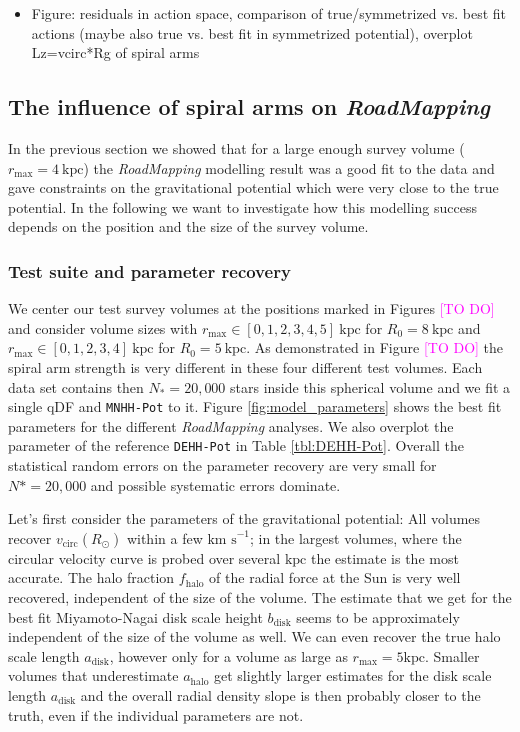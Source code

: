 \documentclass[iop,revtex4,numberedappendix,appendixfloats]{emulateapj}
\newcommand{\RM}{{\sl RoadMapping}}
\newcommand{\Wilma}[1]{\textcolor{Magenta}{#1}}
\begin{document}
\begin{itemize}
\item Figure: residuals in action space, comparison of true/symmetrized vs. best fit actions (maybe also true vs. best fit in symmetrized potential), overplot Lz=vcirc*Rg of spiral arms
\end{itemize}

\clearpage
\newpage

\subsection{The influence of spiral arms on \RM{}}

In the previous section we showed that for a large enough survey volume ($r_\text{max}=4~\text{kpc}$) the \RM{} modelling result was a good fit to the data and gave constraints on the gravitational potential which were very close to the true potential. In the following we want to investigate how this modelling success depends on the position and the size of the survey volume.

\subsubsection{Test suite and parameter recovery}

We center our test survey volumes at the positions marked in Figures \Wilma{[TO DO]} and consider volume sizes with $r_\text{max} \in [0,1,2,3,4,5]~\text{kpc}$ for $R_0 = 8~\text{kpc}$ and $r_\text{max} \in [0,1,2,3,4]~\text{kpc}$ for $R_0 = 5~\text{kpc}$. As demonstrated in Figure \Wilma{[TO DO]} the spiral arm strength is very different in these four different test volumes. Each data set contains then $N_*=20,000$ stars inside this spherical volume and we fit a single qDF and \texttt{MNHH-Pot} to it. Figure \ref{fig:model_parameters} shows the best fit parameters for the different \RM{} analyses. We also overplot the parameter of the reference \texttt{DEHH-Pot} in Table \ref{tbl:DEHH-Pot}. Overall the statistical random errors on the parameter recovery are very small for $N*=20,000$ and possible systematic errors dominate. 

Let's first consider the parameters of the gravitational potential: All volumes recover $v_\text{circ}(R_\odot)$ within a few $\text{km s}^{-1}$; in the largest volumes, where the circular velocity curve is probed over several $\text{kpc}$ the estimate is the most accurate. The halo fraction $f_\text{halo}$ of the radial force at the Sun is very well recovered, independent of the size of the volume. The estimate that we get for the best fit Miyamoto-Nagai disk scale height $b_\text{disk}$ seems to be approximately independent of the size of the volume as well. We can even recover the true halo scale length $a_\text{disk}$, however only for a volume as large as $r_\text{max}=5\text{kpc}$. Smaller volumes that underestimate $a_\text{halo}$ get slightly larger estimates for the disk scale length $a_\text{disk}$ and the overall radial density slope is then probably closer to the truth, even if the individual parameters are not.
\end{document}
